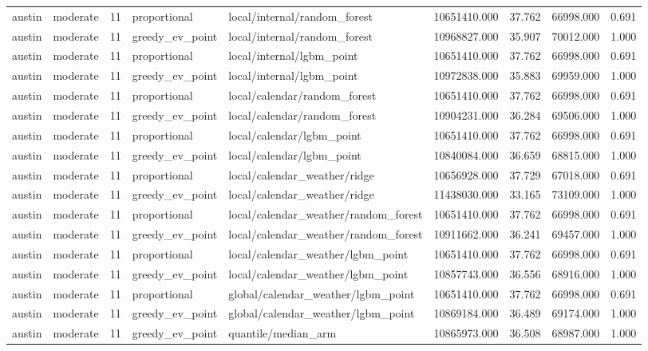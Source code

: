 \begin{tabular}{llrllrrrr}
austin & moderate & 11 & proportional & local/internal/random\_forest & 10651410.000 & 37.762 & 66998.000 & 0.691 \\
austin & moderate & 11 & greedy\_ev\_point & local/internal/random\_forest & 10968827.000 & 35.907 & 70012.000 & 1.000 \\
austin & moderate & 11 & proportional & local/internal/lgbm\_point & 10651410.000 & 37.762 & 66998.000 & 0.691 \\
austin & moderate & 11 & greedy\_ev\_point & local/internal/lgbm\_point & 10972838.000 & 35.883 & 69959.000 & 1.000 \\
austin & moderate & 11 & proportional & local/calendar/random\_forest & 10651410.000 & 37.762 & 66998.000 & 0.691 \\
austin & moderate & 11 & greedy\_ev\_point & local/calendar/random\_forest & 10904231.000 & 36.284 & 69506.000 & 1.000 \\
austin & moderate & 11 & proportional & local/calendar/lgbm\_point & 10651410.000 & 37.762 & 66998.000 & 0.691 \\
austin & moderate & 11 & greedy\_ev\_point & local/calendar/lgbm\_point & 10840084.000 & 36.659 & 68815.000 & 1.000 \\
austin & moderate & 11 & proportional & local/calendar\_weather/ridge & 10656928.000 & 37.729 & 67018.000 & 0.691 \\
austin & moderate & 11 & greedy\_ev\_point & local/calendar\_weather/ridge & 11438030.000 & 33.165 & 73109.000 & 1.000 \\
austin & moderate & 11 & proportional & local/calendar\_weather/random\_forest & 10651410.000 & 37.762 & 66998.000 & 0.691 \\
austin & moderate & 11 & greedy\_ev\_point & local/calendar\_weather/random\_forest & 10911662.000 & 36.241 & 69457.000 & 1.000 \\
austin & moderate & 11 & proportional & local/calendar\_weather/lgbm\_point & 10651410.000 & 37.762 & 66998.000 & 0.691 \\
austin & moderate & 11 & greedy\_ev\_point & local/calendar\_weather/lgbm\_point & 10857743.000 & 36.556 & 68916.000 & 1.000 \\
austin & moderate & 11 & proportional & global/calendar\_weather/lgbm\_point & 10651410.000 & 37.762 & 66998.000 & 0.691 \\
austin & moderate & 11 & greedy\_ev\_point & global/calendar\_weather/lgbm\_point & 10869184.000 & 36.489 & 69174.000 & 1.000 \\
austin & moderate & 11 & greedy\_ev\_point & quantile/median\_arm & 10865973.000 & 36.508 & 68987.000 & 1.000 \\

\end{tabular}
